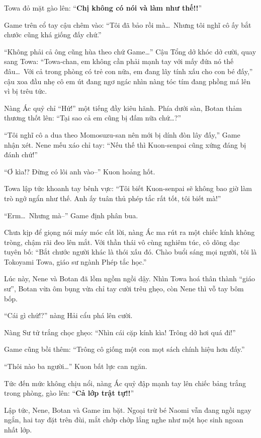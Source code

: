 \documentclass[../main.tex]{subfiles}
\begin{document}
Towa đỏ mặt gào lên: ``\textbf{Chị không có nói và làm như thế!!}''

Game trên cổ tay cậu chêm vào: ``Tôi đã bảo rồi mà\dots\ Nhưng tôi nghĩ cô ấy bắt chước cũng khá giống đấy chứ.''

``Không phải cả ông cũng hùa theo chứ Game\dots'' Cậu Tổng dở khóc dở cười, quay sang Towa: ``Towa-chan, em không cần phải mạnh tay với mấy đứa nó thế đâu\dots\ Với cả trong phòng có trẻ con nữa, em đang lây tính xấu cho con bé đấy,'' cậu xoa đầu nhẹ cô em út đang ngơ ngác nhìn nàng tóc tím đang phồng má lên vì bị trêu tức.

Nàng Ác quỷ chỉ ``Hứ!'' một tiếng đầy kiêu hãnh. Phía dưới sàn, Botan thảm thương thốt lên: ``Tại sao cả em cũng bị đấm nữa chứ\dots?''

``Tôi nghĩ cô a dua theo Momosuzu-san nên mới bị dính đòn lây đấy,'' Game nhận xét. Nene mếu xáo chỉ tay: ``Nếu thế thì Kuon-senpai cũng xứng đáng bị đánh chứ!''

``Ơ kìa!? Đừng có lôi anh vào--'' Kuon hoảng hốt.

Towa lập tức khoanh tay bênh vực: ``Tôi biết Kuon-senpai sẽ không bao giờ làm trò ngớ ngẩn như thế. Anh ấy tuân thủ phép tắc rất tốt, tôi biết mà!''

``Erm\dots\ Nhưng mà--'' Game định phân bua.

Chưa kịp để giọng nói máy móc cất lời, nàng Ác ma rút ra một chiếc kính không tròng, chậm rãi đeo lên mắt. Với thần thái vô cùng nghiêm túc, cô dõng dạc tuyên bố: ``Bắt chước người khác là thói xấu đó. Chào buổi sáng mọi người, tôi là Tokoyami Towa, giáo sư ngành Phép tắc học.''


Lúc này, Nene và Botan đã lồm ngồm ngồi dậy. Nhìn Towa hoá thân thành ``giáo sư'', Botan vừa ôm bụng vừa chỉ tay cười trêu ghẹo, còn Nene thì vỗ tay bôm bốp.

``Cái gì chứ!?'' nàng Hải cẩu phá lên cười.

Nàng Sư tử trắng chọc ghẹo: ``Nhìn cái cặp kính kìa! Trông dở hơi quá đi!''

Game cũng bồi thêm: ``Trông cô giống một con mọt sách chính hiệu hơn đấy.''

``Thôi nào ba người\dots'' Kuon bất lực can ngăn.

Tức đến mức không chịu nổi, nàng Ác quỷ đập mạnh tay lên chiếc bảng trắng trong phòng, gào lên: ``\textbf{Cả lớp trật tự!!}''

Lập tức, Nene, Botan và Game im bặt. Ngoại trừ bé Naomi vẫn đang ngồi ngay ngắn, hai tay đặt trên đùi, mắt chớp chớp lắng nghe như một học sinh ngoan nhất lớp.
\end{document}
